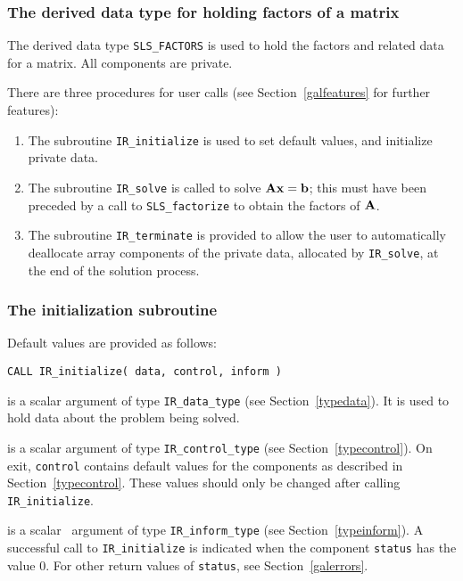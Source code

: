 \documentclass{galahad}
\newcommand{\packagename}{IR}
\begin{document}

\subsubsection{The derived data type for holding factors of a matrix}
\label{typefactors}
The derived data type
{\tt SLS\_FACTORS}
is used to hold the factors and related data for a matrix.
All components are private.


\galarguments
There are three procedures for user calls
(see Section~\ref{galfeatures} for further features):

\begin{enumerate}
\item The subroutine
      {\tt \packagename\_initialize}
      is used to set default values, and initialize private data.
\item The subroutine
      {\tt \packagename\_solve}
      is called to solve ${\mathbf{A}} {\mathbf{x}} = {\mathbf{b}}$; this must have been preceded
      by a call to {\tt SLS\_factorize} to obtain the factors of ${\mathbf{A}}$.
\item The subroutine
      {\tt \packagename\_terminate}
      is provided to allow the user to automatically deallocate array
       components of the private data, allocated by
       {\tt \packagename\_solve},
       at the end of the solution process.
\end{enumerate}


\subsubsection{The initialization subroutine}\label{subinit}
 Default values are provided as follows:

\hskip0.5in
{\tt CALL \packagename\_initialize( data, control, inform )}

\begin{description}

 is a scalar \intentinout argument of type
{\tt \packagename\_data\_type}
(see Section~\ref{typedata}). It is used to hold data about the problem being
solved.

 is a scalar \intentout argument of type
{\tt \packagename\_control\_type}
(see Section~\ref{typecontrol}).
On exit, {\tt control} contains default values for the components as
described in Section~\ref{typecontrol}.
These values should only be changed after calling
{\tt \packagename\_initialize}.

 is a scalar \intentout\ argument of type
{\tt \packagename\_inform\_type}
(see Section~\ref{typeinform}). A successful call to
{\tt \packagename\_initialize}
is indicated when the  component {\tt status} has the value 0.
For other return values of {\tt status}, see Section~\ref{galerrors}.

\end{description}
\end{document}
